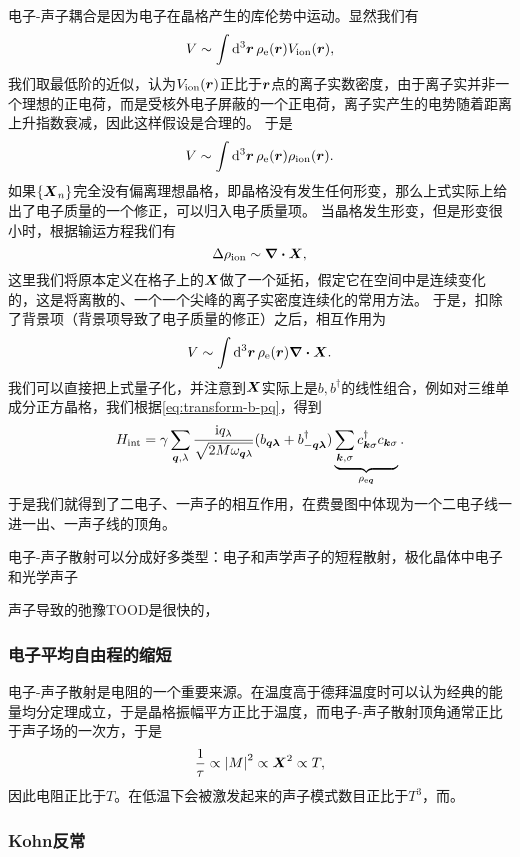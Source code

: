 电子-声子耦合是因为电子在晶格产生的库伦势中运动。显然我们有
\[
    V \sim \int \dd[3]{\vb*{r}} \rho_\text{e}(\vb*{r}) V_\text{ion}(\vb*{r}),
\]
我们取最低阶的近似，认为$V_\text{ion}(\vb*{r})$正比于$\vb*{r}$点的离子实数密度，由于离子实并非一个理想的正电荷，而是受核外电子屏蔽的一个正电荷，离子实产生的电势随着距离上升指数衰减，因此这样假设是合理的。
于是
\[
    V \sim \int \dd[3]{\vb*{r}} \rho_\text{e}(\vb*{r}) \rho_\text{ion}(\vb*{r}).
\]
如果$\{\vb*{X}_n\}$完全没有偏离理想晶格，即晶格没有发生任何形变，那么上式实际上给出了电子质量的一个修正，可以归入电子质量项。
当晶格发生形变，但是形变很小时，根据输运方程我们有
\[
    \Delta \rho_\text{ion} \sim \div{\vb*{X}},
\]
这里我们将原本定义在格子上的$\vb*{X}$做了一个延拓，假定它在空间中是连续变化的，这是将离散的、一个一个尖峰的离子实密度连续化的常用方法。
于是，扣除了背景项（背景项导致了电子质量的修正）之后，相互作用为
\[
    V \sim \int \dd[3]{\vb*{r}} \rho_\text{e}(\vb*{r}) \div{\vb*{X}}.
\]
我们可以直接把上式量子化，并注意到${\vb*{X}}$实际上是${b}, {b}^\dagger$的线性组合，例如对三维单成分正方晶格，我们根据\eqref{eq:transform-b-pq}，得到
\begin{equation}
    {H}_\text{int} = \gamma \sum_{\vb*{q}, \lambda} \frac{\mathrm{i} q_\lambda}{\sqrt{2 M \omega_{\vb*{q} \lambda}}} ({b}_{\vb*{q} \vb*{\lambda}} + {b}^\dagger_{-\vb*{q} \vb*{\lambda}}) \underbrace{\sum_{\vb*{k}, \sigma} {c}^\dagger_{\vb*{k} \sigma} {c}_{\vb*{k} \sigma}}_{{\rho}_{\text{e} \vb*{q}}}.
    \label{eq:simple-phonon-electron-int}
\end{equation}
于是我们就得到了二电子、一声子的相互作用，在费曼图中体现为一个二电子线一进一出、一声子线的顶角。

电子-声子散射可以分成好多类型：电子和声学声子的短程散射，极化晶体中电子和光学声子 %

声子导致的弛豫TOOD是很快的，

\subsubsection{电子平均自由程的缩短}

电子-声子散射是电阻的一个重要来源。在温度高于德拜温度时可以认为经典的能量均分定理成立，于是晶格振幅平方正比于温度，而电子-声子散射顶角通常正比于声子场的一次方，于是
\[
    \frac{1}{\tau} \propto \abs{M}^2 \propto \vb*{X}^2 \propto T,
\]
因此电阻正比于$T$。在低温下会被激发起来的声子模式数目正比于$T^3$，而。

\subsubsection{Kohn反常}

